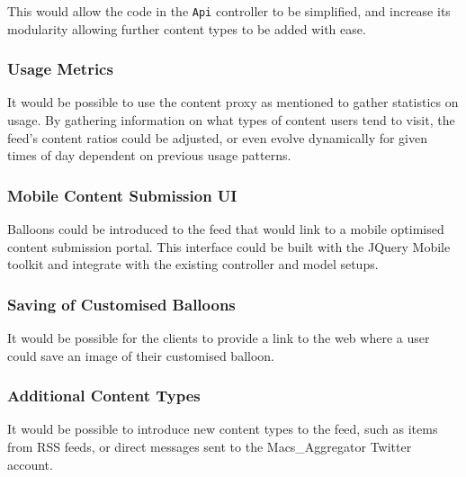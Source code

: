 This would allow the code in the \texttt{Api} controller to be simplified, and increase its modularity allowing further content types to be added with ease.

\subsubsection{Usage Metrics}
It would be possible to use the content proxy as mentioned to gather statistics on usage. By gathering information on what types of content users tend to visit, the feed's content ratios could be adjusted, or even evolve dynamically for given times of day dependent on previous usage patterns.

\subsubsection{Mobile Content Submission UI}
Balloons could be introduced to the feed that would link to a mobile optimised content submission portal. This interface could be built with the JQuery Mobile toolkit and integrate with the existing controller and model setups.

\subsubsection{Saving of Customised Balloons}
It would be possible for the clients to provide a link to the web where a user could save an image of their customised balloon.

\subsubsection{Additional Content Types}
It would be possible to introduce new content types to the feed, such as items from RSS feeds, or direct messages sent to the Macs\_Aggregator Twitter account.
